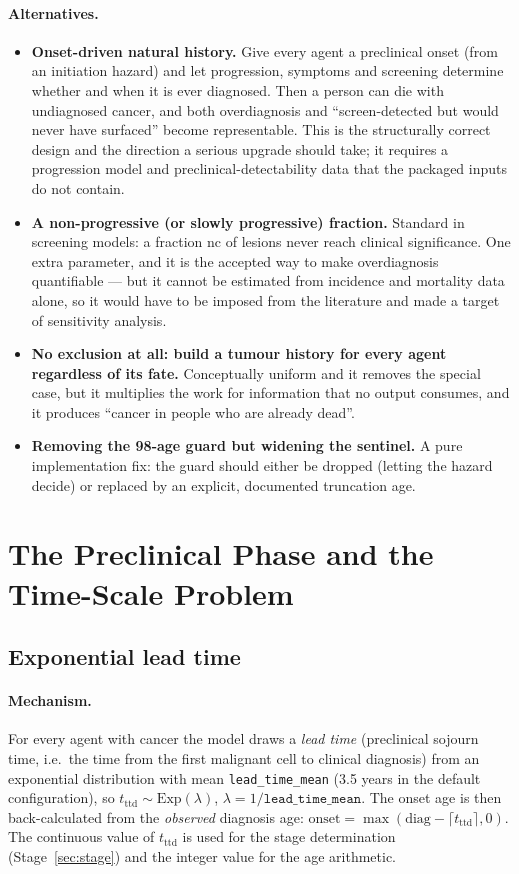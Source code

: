 \documentclass[12pt,a4paper]{article}
\newcommand{\id}[1]{\texttt{#1}}
\newcommand{\mech}[1]{\paragraph{Mechanism.} #1}
\newcommand{\alt}[1]{\paragraph{Alternatives.} #1}
\begin{document}
\alt{\begin{itemize}[nosep]
  \item \textbf{Onset-driven natural history.} Give every agent a preclinical onset (from an initiation
        hazard) and let progression, symptoms and screening determine whether and when it is ever
        diagnosed. Then a person can die with undiagnosed cancer, and both overdiagnosis and
        ``screen-detected but would never have surfaced'' become representable. This is the structurally
        correct design and the direction a serious upgrade should take; it requires a progression model
        and preclinical-detectability data that the packaged inputs do not contain.
  \item \textbf{A non-progressive (or slowly progressive) fraction.} Standard in screening models: a
        fraction $\mathrm{nc}$ of lesions never reach clinical significance. One extra parameter, and it
        is the accepted way to make overdiagnosis quantifiable --- but it cannot be estimated from
        incidence and mortality data alone, so it would have to be imposed from the literature and made a
        target of sensitivity analysis.
  \item \textbf{No exclusion at all: build a tumour history for every agent regardless of its fate.}
        Conceptually uniform and it removes the special case, but it multiplies the work for information
        that no output consumes, and it produces ``cancer in people who are already dead''.
  \item \textbf{Removing the 98-age guard but widening the sentinel.} A pure implementation fix: the
        guard should either be dropped (letting the hazard decide) or replaced by an explicit, documented
        truncation age.
\end{itemize}}

\section{The Preclinical Phase and the Time-Scale Problem}

\subsection{Exponential lead time}

\mech{For every agent with cancer the model draws a \emph{lead time} (preclinical sojourn time, i.e.\ the
time from the first malignant cell to clinical diagnosis) from an exponential distribution with mean
\id{lead\_time\_mean} (3.5 years in the default configuration), so
$t_{\text{ttd}} \sim \mathrm{Exp}(\lambda)$, $\lambda = 1/\id{lead\_time\_mean}$. The onset age is then
back-calculated from the \emph{observed} diagnosis age: $\text{onset} = \max(\text{diag} - \lceil t_{\text{ttd}}\rceil, 0)$.
The continuous value of $t_{\text{ttd}}$ is used for the stage determination (Stage~\ref{sec:stage}) and the
integer value for the age arithmetic.}
\end{document}
